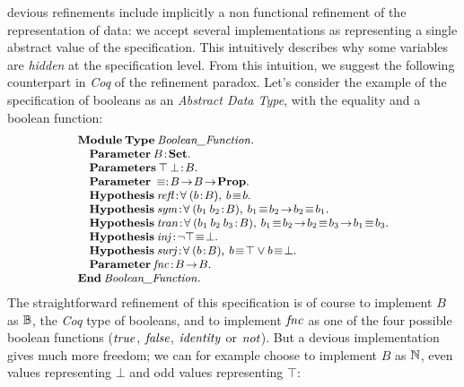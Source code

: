 \documentclass[conference]{IEEEtran}
\begin{document}
devious refinements include implicitly a non functional refinement of the representation of
data: we accept several implementations as representing a single abstract value of the
specification. This intuitively describes why some variables are \emph{hidden} at the
specification level. From this intuition, we suggest the following counterpart in \emph{Coq}
of the refinement paradox. Let's consider the example of the specification of booleans as an
\emph{Abstract Data Type}, with the equality and a boolean function:
\[\small\begin{array}{l}
\Cmd{Module\:Type}\:\fid{Boolean\_Function}.\\
\quad\Cmd{Parameter}\:B\!:\!\Cmd{Set}.\\
\quad\Cmd{Parameters}\:\top\:\bot\!:\!B.\\
\quad\Cmd{Parameter}\:\equiv:\!B\!\to\!B\!\to\!\Cmd{Prop}.\\
\quad\Cmd{Hypothesis}\:\fid{refl}\!:\!\forall\:(b\!:\!B),\:b\!\equiv\!b.\\
\quad\Cmd{Hypothesis}\:\fid{sym}\!:\!
 \forall\:(b_1\:b_2\!:\!B),\:b_1\!\equiv\!b_2\!\to\!b_2\!\equiv\!b_1.\\
\quad\Cmd{Hypothesis}\:\fid{tran}\!:\!
 \forall\:(b_1\:b_2\:b_3\!:\!B),
 \:b_1\!\equiv\!b_2\!\to\!b_2\!\equiv\!b_3\!\to\!b_1\!\equiv\!b_3.\\
\quad\Cmd{Hypothesis}\:\fid{inj}\!:\!\lnot\top\!\equiv\!\bot.\\
\quad\Cmd{Hypothesis}\:\fid{surj}\!:\!\forall\:(b\!:\!B),\:
 b\!\equiv\!\top\lor b\!\equiv\!\bot.\\
\quad\Cmd{Parameter}\:\fid{fnc}\!:\!B\!\to\!B.\\
\Cmd{End}\:\fid{Boolean\_Function}.
\end{array}\]
The straightforward refinement of this specification is of course to implement {\small$B$} as
{\small$\mathbb{B}$}, the \emph{Coq} type of booleans, and to implement {\small$\textrm{\emph{fnc}}$} as one
of the four possible boolean functions ({\small$\textrm{\emph{true}}$}, {\small$\textrm{\emph{false}}$},
{\small$\textrm{\emph{identity}}$} or {\small$\textrm{\emph{not}}$}). But a devious implementation gives much more
freedom; we can for example choose to implement {\small$B$} as {\small$\mathbb{N}$}, even values
representing {\small$\bot$} and odd values representing {\small$\top$}:
\end{document}
